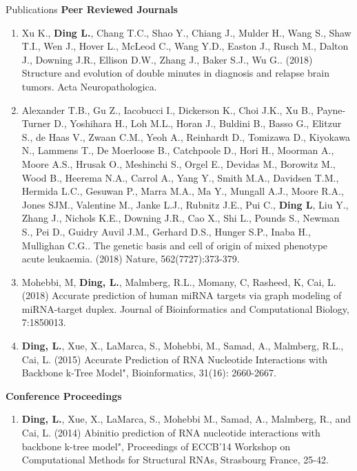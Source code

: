 \documentclass{resume} %
\begin{document}

\begin{rSection}{Publications}
\textbf{Peer Reviewed Journals}
\begin{enumerate}
\item Xu K., \textbf{Ding L.}, Chang T.C., Shao Y., Chiang J., Mulder H., Wang S., Shaw T.I., Wen J., Hover L., McLeod C., Wang Y.D., Easton J., Rusch M., Dalton J., Downing J.R., Ellison D.W., Zhang J., Baker S.J., Wu G.. (2018) Structure and evolution of double minutes in diagnosis and relapse brain tumors. Acta Neuropathologica.

\item Alexander T.B., Gu Z., Iacobucci I., Dickerson K., Choi J.K., Xu B., Payne-Turner D., Yoshihara H., Loh M.L., Horan J., Buldini B., Basso G., Elitzur S., de Haas V., Zwaan C.M., Yeoh A., Reinhardt D., Tomizawa D., Kiyokawa N., Lammens T., De Moerloose B., Catchpoole D., Hori H., Moorman A., Moore A.S., Hrusak O., Meshinchi S., Orgel E., Devidas M., Borowitz M., Wood B., Heerema N.A., Carrol A., Yang Y., Smith M.A., Davidsen T.M., Hermida L.C., Gesuwan P., Marra M.A., Ma Y., Mungall A.J., Moore R.A., Jones SJM., Valentine M., Janke L.J., Rubnitz J.E., Pui C., \textbf{Ding L}, Liu Y., Zhang J., Nichols K.E., Downing J.R., Cao X., Shi L., Pounds S., Newman S., Pei D., Guidry Auvil J.M., Gerhard D.S., Hunger S.P., Inaba H., Mullighan C.G.. The genetic basis and cell of origin of mixed phenotype acute leukaemia. (2018) Nature, 562(7727):373-379.

\item Mohebbi, M, \textbf{Ding, L.}, Malmberg, R.L., Momany, C, Rasheed, K, Cai, L. (2018)
Accurate prediction of human miRNA targets via graph modeling of miRNA-target duplex. Journal of Bioinformatics and Computational Biology, 7:1850013.

\item \textbf{Ding, L.}, Xue, X., LaMarca, S., Mohebbi, M., Samad, A., Malmberg, R.L., Cai, L. (2015) Accurate Prediction of RNA Nucleotide Interactions with Backbone k-Tree Model", Bioinformatics, 31(16): 2660-2667.

\end{enumerate}


\textbf{Conference Proceedings}
\begin{enumerate}
\item \textbf{Ding, L.}, Xue, X., LaMarca, S., Mohebbi M., Samad, A., Malmberg, R., and Cai, L. (2014) Abinitio prediction of RNA nucleotide interactions with backbone k-tree model", Proceedings of ECCB'14 Workshop on Computational Methods for Structural RNAs, Strasbourg France, 25-42.


\end{enumerate}
\end{rSection}
\end{document}
